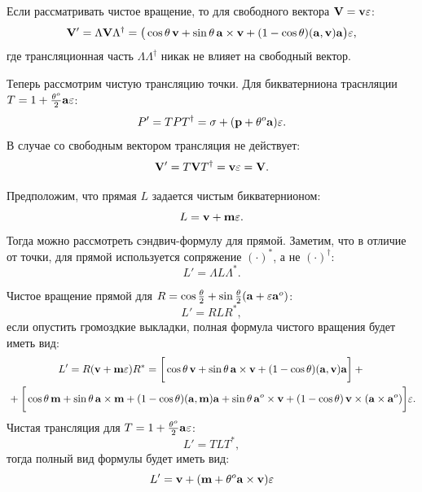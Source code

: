 Если рассматривать чистое вращение, то для свободного вектора $\vb{V} = \vb{v}\varepsilon$:
\begin{equation*}
    \vb{V}' = \Lambda \vb{V} \Lambda^\dagger = \big(\cos\theta\,\vb{v} + \sin\theta\,\vb{a}\times\vb{v} + (1-\cos\theta)(\vb{a},\vb{v})\vb{a}\big)\varepsilon,
\end{equation*}
где трансляционная часть $\Lambda\Lambda^\dagger$  никак не влияет на свободный вектор.

Теперь рассмотрим чистую трансляцию точки. Для бикватерниона траснляции $T = 1 + \frac{\theta^o}{2}\vb{a}\varepsilon$:
\begin{equation*}
    P' = T P T^\dagger = \sigma + (\vb{p} + \theta^o\vb{a})\varepsilon.
\end{equation*}
В случае со свободным вектором трансляция не действует:
\begin{equation*}
    \vb{V}' = T \vb{V} T^\dagger = \vb{v}\varepsilon = \vb{V}.
\end{equation*}

Предположим, что прямая $L$ задается чистым бикватернионом:
\begin{equation*}
    L = \vb{v} + \vb{m}\varepsilon.
\end{equation*}
Тогда можно рассмотреть сэндвич-формулу для прямой. Заметим, что в отличие от точки, для прямой используется сопряжение $(\cdot)^*$, а не $(\cdot)^\dagger$:
\begin{equation*}
    L' = \Lambda L \Lambda^*.
\end{equation*}

Чистое вращение прямой для $R = \cos\frac{\theta}{2} + \sin\frac{\theta}{2}(\vb{a} + \varepsilon\vb{a}^o)$:
\begin{equation*}
    L' = R L R^*,
\end{equation*}
если опустить громоздкие выкладки, полная формула чистого вращения будет иметь вид:
\begin{multline*}
    L' = R(\vb{v} + \vb{m}\varepsilon)R^* = \bigg[ \cos\theta\,\vb{v} + \sin\theta\,\vb{a}\times\vb{v} + (1-\cos\theta)(\vb{a},\vb{v})\vb{a} \bigg] +{}\\
    {}+ \bigg[ \cos\theta\,\vb{m} + \sin\theta\,\vb{a}\times\vb{m} + (1-\cos\theta)(\vb{a},\vb{m})\vb{a} + \sin\theta\,\vb{a}^o\times\vb{v} + (1-\cos\theta)\,\vb{v}\times(\vb{a}\times\vb{a}^o) \bigg] \varepsilon.
\end{multline*}
Чистая трансляция для $T = 1 + \frac{\theta^o}{2}\vb{a}\varepsilon$:
\begin{equation*}
    L' = T L T^*,
\end{equation*}
тогда полный вид формулы будет иметь вид:
\begin{equation*}
    L' = \vb{v} + (\vb{m} + \theta^o\vb{a}\times\vb{v})\varepsilon
\end{equation*}

